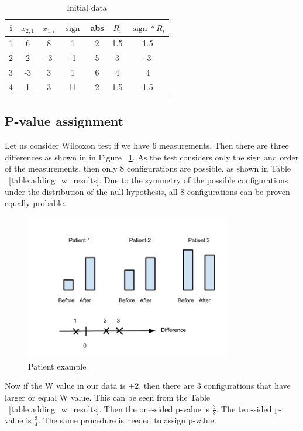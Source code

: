 \documentclass[12pt]{article}
\DeclareMathOperator{\sign}{sign}
\begin{document}
{\begin{table}[h!]
  \begin{center}
    \begin{tabular}{ccccccc}
      \hline
      i & $x_{2, 1}$ & $x_{1, i}$ & $\sign$ & abs & $R_i$ & $\sign * R_i$\\
      \hline
      1 & 6 & 8 & 1 & 2 & 1.5 & 1.5 \\
      \hline
      2 & 2 & -3 & -1 & 5 & 3 & -3 \\
      \hline
      3 & -3 & 3 & 1 & 6 & 4 & 4 \\
      \hline
      4 & 1 & 3 & 11 & 2 & 1.5 & 1.5 \\
      \hline
    \end{tabular}
    \caption{Initial data}
    \label{table:wilx_example}
  \end{center}
\end{table}


\subsection{P-value assignment}
Let us consider Wilcoxon test if we have 6 measurements. Then there are three differences as shown in in Figure ~\ref{fig:patientExample}. As the test considers only the sign and order of the measurements, then only 8 configurations are possible, as shown in Table ~\ref{table:adding_w_results}. Due to the symmetry of the possible configurations under the distribution of the null hypothesis, all 8 configurations can be proven equally probable.
\begin{figure}[h!]
  \centering
  \includegraphics[width=0.8\textwidth]{patientExample}
  \caption{Patient example}
  \label{fig:patientExample}
\end{figure}

Now if the W value in our data is $+2$, then there are 3 configurations that have larger or equal W value. This can be seen from the Table ~\ref{table:adding_w_results}. Then the one-sided p-value is $\frac{3}{8}$. The two-sided p-value is $\frac{3}{4}$. The same procedure is needed to assign p-value.

}
\end{document}
